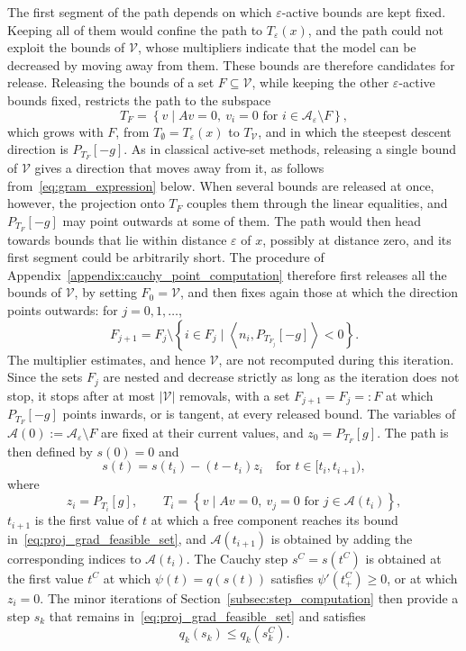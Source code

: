 \documentclass[pdflatex,sn-mathphys-num]{sn-jnl}%
\theoremstyle{thmstyleone}%
\newcommand{\calA}{{\mathcal{A}}}
\newcommand{\inner}[2]{\left\langle {#1} , {#2} \right\rangle} %
\newcommand{\proj}[2]{P_{#1} \left[ {#2} \right]} %
\begin{document}
The first segment of the path depends on which $\varepsilon$-active bounds are kept fixed. Keeping all of them would confine the path to $T_\varepsilon(x)$, and the path could not exploit the bounds of $\mathcal{V}$, whose multipliers indicate that the model can be decreased by moving away from them. These bounds are therefore candidates for release. Releasing the bounds of a set $F \subseteq \mathcal{V}$, while keeping the other $\varepsilon$-active bounds fixed, restricts the path to the subspace
\[T_F = \left\{v \mid Av = 0,\ v_i = 0 \text{ for } i \in \calA_\varepsilon\setminus F\right\},\]
which grows with $F$, from $T_\emptyset = T_\varepsilon(x)$ to $T_{\mathcal{V}}$, and in which the steepest descent direction is $\proj{T_F}{-g}$. As in classical active-set methods, releasing a single bound of $\mathcal{V}$ gives a direction that moves away from it, as follows from~\eqref{eq:gram_expression} below. When several bounds are released at once, however, the projection onto $T_F$ couples them through the linear equalities, and $\proj{T_F}{-g}$ may point outwards at some of them. The path would then head towards bounds that lie within distance $\varepsilon$ of $x$, possibly at distance zero, and its first segment could be arbitrarily short. The procedure of Appendix~\ref{appendix:cauchy_point_computation} therefore first releases all the bounds of $\mathcal{V}$, by setting $F_0 = \mathcal{V}$, and then fixes again those at which the direction points outwards: for $j = 0,1,\ldots$,
\begin{equation}\label{eq:refixing}
	F_{j+1} = F_j \setminus \left\{ i \in F_j \mid \inner{n_i}{\proj{T_{F_j}}{-g}} < 0 \right\}.
\end{equation}
The multiplier estimates, and hence $\mathcal{V}$, are not recomputed during this iteration. Since the sets $F_j$ are nested and decrease strictly as long as the iteration does not stop, it stops after at most $|\mathcal{V}|$ removals, with a set $F_{j+1} = F_j =: F$ at which $\proj{T_F}{-g}$ points inwards, or is tangent, at every released bound. The variables of $\calA(0) := \calA_\varepsilon \setminus F$ are fixed at their current values, and $z_0 = \proj{T_F}{g}$. The path is then defined by $s(0) = 0$ and
\[s(t) = s(t_i) - (t-t_i)z_i \quad \text{for } t \in [t_i,t_{i+1}),\]
where
\begin{equation}\label{eq:reduced_gradient_proj_grad_path}
	z_i = \proj{T_i}{g}, \qquad T_i = \left\{v \mid Av = 0,\ v_j = 0 \text{ for } j \in \calA(t_i)\right\},
\end{equation}
$t_{i+1}$ is the first value of $t$ at which a free component reaches its bound in~\eqref{eq:proj_grad_feasible_set}, and $\calA(t_{i+1})$ is obtained by adding the corresponding indices to $\calA(t_i)$. The Cauchy step $s^C = s(t^C)$ is obtained at the first value $t^C$ at which $\psi(t) = q(s(t))$ satisfies $\psi'(t^C_+) \ge 0$, or at which $z_i = 0$. The minor iterations of Section~\ref{subsec:step_computation} then provide a step $s_k$ that remains in~\eqref{eq:proj_grad_feasible_set} and satisfies
\begin{equation}\label{eq:step_drecrease_wrt_cauchy}
	q_k(s_k) \le q_k(s_k^C).
\end{equation}
\end{document}

